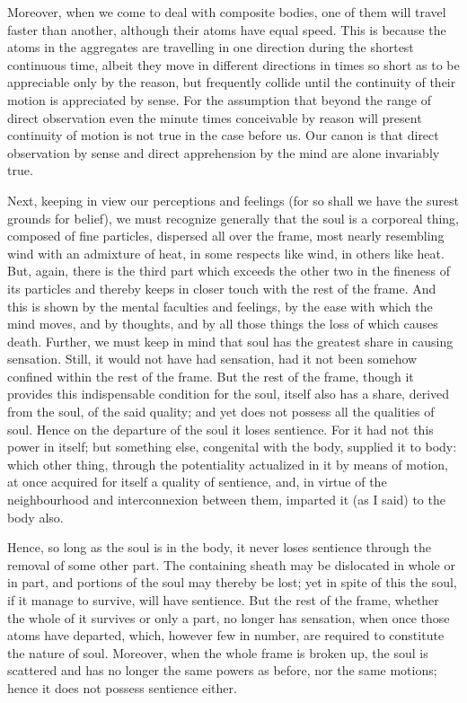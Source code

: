 \documentclass{stex}
\begin{document}
Moreover, when we come to deal with composite bodies, one of them will travel faster than another, although their atoms have equal speed.
This is because the atoms in the aggregates are travelling in one direction during the shortest continuous time, albeit they move in different directions in times so short as to be appreciable only by the reason, but frequently collide until the continuity of their motion is appreciated by sense.
For the assumption that beyond the range of direct observation even the minute times conceivable by reason will present continuity of motion is not true in the case before us.
Our canon is that direct observation by sense and direct apprehension by the mind are alone invariably true.

Next, keeping in view our perceptions and feelings (for so shall we have the surest grounds for belief), we must recognize generally that the soul is a corporeal thing, composed of fine particles, dispersed all over the frame, most nearly resembling wind with an admixture of heat, in some respects like wind, in others like heat.
But, again, there is the third part which exceeds the other two in the fineness of its particles and thereby keeps in closer touch with the rest of the frame.
And this is shown by the mental faculties and feelings, by the ease with which the mind moves, and by thoughts, and by all those things the loss of which causes death.
Further, we must keep in mind that soul has the greatest share in causing sensation.
Still, it would not have had sensation, had it not been somehow confined within the rest of the frame.
But the rest of the frame, though it provides this indispensable condition for the soul, itself also has a share, derived from the soul, of the said quality; and yet does not possess all the qualities of soul.
Hence on the departure of the soul it loses sentience.
For it had not this power in itself; but something else, congenital with the body, supplied it to body: which other thing, through the potentiality actualized in it by means of motion, at once acquired for itself a quality of sentience, and, in virtue of the neighbourhood and interconnexion between them, imparted it (as I said) to the body also.

Hence, so long as the soul is in the body, it never loses sentience through the removal of some other part.
The containing sheath may be dislocated in whole or in part, and portions of the soul may thereby be lost; yet in spite of this the soul, if it manage to survive, will have sentience.
But the rest of the frame, whether the whole of it survives or only a part, no longer has sensation, when once those atoms have departed, which, however few in number, are required to constitute the nature of soul.
Moreover, when the whole frame is broken up, the soul is scattered and has no longer the same powers as before, nor the same motions; hence it does not possess sentience either.
\end{document}
